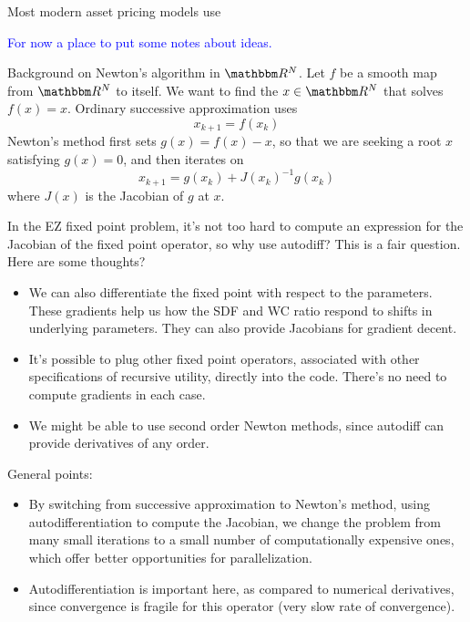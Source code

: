 \documentclass[12pt, reqno]{amsart}
\newcommand{\1}{\mathbbm 1}
\newcommand{\RR}{\mathbbm R}
\theoremstyle{plain}
\theoremstyle{definition}
\begin{document}
Most modern asset pricing models use 

\textcolor{blue}{For now a place to put some notes about ideas.}

Background on Newton's algorithm in $\RR^N$.  Let $f$ be a smooth map from
$\RR^N$ to itself.  We want to find the $x \in \RR^N$ that solves $f(x)=x$.
Ordinary successive approximation uses
%
\begin{equation}
    x_{k+1} = f(x_k)
\end{equation}
%
Newton's method first sets $g(x) = f(x) -x$, so that we are seeking a root $x$
satisfying $g(x)=0$, and then iterates on
%
\begin{equation}
    x_{k+1} = g(x_k) + J(x_k)^{-1} g(x_k)
\end{equation}
%
where $J(x)$ is the Jacobian of $g$ at $x$.

In the EZ fixed point problem, it's not too hard to compute an expression for
the Jacobian of the fixed point operator, so why use autodiff?  This is a fair
question.  Here are some thoughts?
%
\begin{itemize}
    \item We can also differentiate the fixed point with respect to the
        parameters. These gradients help us how the SDF and WC ratio respond
        to shifts in underlying parameters.  They can also provide Jacobians
        for gradient decent.
    \item It's possible to plug other fixed point operators, associated with
        other specifications of recursive utility, directly into the code.
        There's no need to compute gradients in each case.
    \item We might be able to use second order Newton methods, since autodiff
        can provide derivatives of any order.
\end{itemize}

General points:
%
\begin{itemize}
    \item By switching from successive approximation to Newton's method, using
        autodifferentiation to compute the Jacobian, we change the problem
        from many small iterations to a small number of computationally
        expensive ones, which offer better opportunities for parallelization. 
    \item Autodifferentiation is important here, as compared to numerical
        derivatives, since convergence is fragile for this operator (very slow
        rate of convergence).
\end{itemize}
\end{document}
